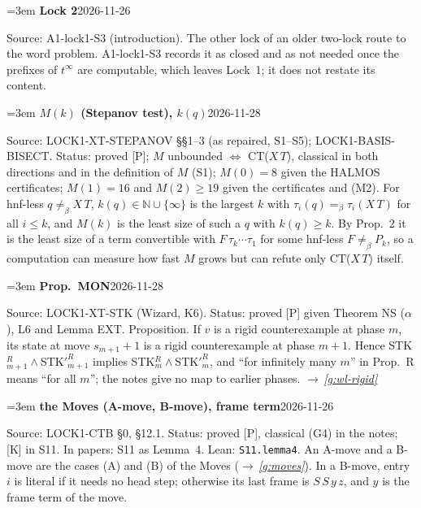 \documentclass[11pt]{amsart}
\makeatletter
\newcommand{\conv}{=_\beta}
\newcounter{sense}
\newenvironment{entry}[3]{%
  \par\addvspace{\medskipamount}\noindent\phantomsection
  \def\@currentlabel{#2}\label{#1}\setcounter{sense}{0}\raggedright\emergencystretch=3em%
  \textbf{#2}\hfill{\footnotesize\textsf{#3}}\par\nopagebreak\noindent\ignorespaces}%
  {\par}
\newcommand{\src}[1]{\textsf{Source:} #1.\enskip}
\newcommand{\lean}[1]{\textsf{Lean:} #1.\enskip}
\newcommand{\status}[1]{\textsf{Status:} #1.\enskip}
\newcommand{\appears}[1]{\textsf{In papers:} #1.\enskip}
\renewcommand{\see}[1]{$\rightarrow$\,\emph{\ref{#1}}}
\makeatother
\begin{document}
\begin{entry}{g:wl-lock2}{Lock 2}{2026-11-26}
\src{A1-lock1-S3 (introduction)}
The other lock of an older two-lock route to the word problem. A1-lock1-S3 records it as closed and
as not needed once the prefixes of $t^\infty$ are computable, which leaves Lock~1; it does not restate
its content.
\end{entry}

\begin{entry}{g:wl-mk}{$M(k)$ (Stepanov test), $k(q)$}{2026-11-28}
\src{LOCK1-XT-STEPANOV \S\S1--3 (as repaired, S1--S5); LOCK1-BASIS-BISECT}
\status{proved [P]; $M$ unbounded $\Leftrightarrow$ CT($X\,T$), classical in both directions and in the
definition of $M$ (S1); $M(0)=8$ given the HALMOS certificates; $M(1)=16$ and $M(2)\ge19$ given the
certificates and (M2)}
For hnf-less $q\not\conv X\,T$, $k(q)\in\mathbb N\cup\{\infty\}$ is the largest $k$ with
$\tau_i(q)\conv\tau_i(X\,T)$ for all $i\le k$, and $M(k)$ is the least size of such a $q$ with $k(q)\ge
k$. By Prop.~2 it is the least size of a term convertible with $F\,\tau_k\cdots\tau_1$ for some hnf-less
$F\not\conv P_k$, so a computation can measure how fast $M$ grows but can refute only CT($X\,T$) itself.
\end{entry}

\begin{entry}{g:wl-mon}{Prop.~MON}{2026-11-28}
\src{LOCK1-XT-STK (Wizard, K6)}
\status{proved [P] given Theorem NS ($\alpha$), L6 and Lemma EXT}
Proposition. If $v$ is a rigid counterexample at phase $m$, its state at move $s_{m+1}+1$ is a rigid
counterexample at phase $m+1$. Hence STK$^R_{m+1}\wedge{}$STK$'^R_{m+1}$ implies STK$^R_m\wedge{}$STK$'^R_m$,
and ``for infinitely many $m$'' in Prop.~R means ``for all $m$''; the notes give no map to earlier phases.
\see{g:wl-rigid}
\end{entry}

\begin{entry}{g:wl-moves}{the Moves (A-move, B-move), frame term}{2026-11-26}
\src{LOCK1-CTB \S0, \S12.1}
\status{proved [P], classical (G4) in the notes; [K] in S11}
\appears{S11 as Lemma~4}
\lean{\texttt{S11.lemma4}}
An A-move and a B-move are the cases (A) and (B) of the Moves (\see{g:moves}). In a B-move, entry $i$
is literal if it needs no head step; otherwise its last frame is $S\,S\,y\,z$, and $y$ is the frame
term of the move.
\end{entry}
\end{document}
